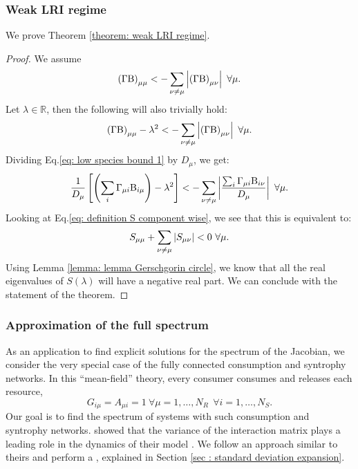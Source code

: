 \documentclass[12pt, titlepage, twoside, openright]{report}
\begin{document}
\subsubsection{Weak LRI regime}\label{sec : weak LRI regime}
We prove Theorem \ref{theorem: weak LRI regime}.
\begin{proof}
We assume
\begin{equation}
\left(\Gamma \text{B}\right)_{\mu\mu} < - \sum_{\nu \neq \mu } \left|{\left(\Gamma \text{B}\right)_{\mu \nu}}\right|  \ \forall \mu.
\end{equation}
Let $\lambda \in \mathbb{R}$, then the following will also trivially hold:
\begin{equation}
  \left(\Gamma\Beta \right)_{\mu\mu} -\lambda^2 < - \sum_{\nu \neq \mu } \abs{\left(\Gamma \Beta\right)_{\mu \nu}} \ \forall \mu. \label{eq: low species bound 1}
\end{equation}
Dividing Eq.\eqref{eq: low species bound 1} by $D_\mu$, we get:
\begin{equation}
\frac{1}{D_\mu}\left[\left(\sum_i \Gamma_{\mu i} \Beta_{i \mu} \right)-{\lambda^2}\right] < - \sum_{\nu \neq \mu } \abs{\frac{\sum_i \Gamma_{\mu i}\Beta_{i\nu}}{D_\mu}} \ \forall \mu.
\end{equation}
Looking at Eq.\eqref{eq: definition S component wise}, we see that this is equivalent to:
\begin{equation}
S_{\mu \mu} + \sum_{\nu \neq \mu} \left|{S_{\mu \nu}}\right| < 0\ \forall \mu.
\end{equation}
Using Lemma \ref{lemma: lemma Gerschgorin circle}, we know that all the real eigenvalues of $S(\lambda)$ will have a negative real part.
We can conclude with the statement of the theorem.
\end{proof}

\normalfont

\subsubsection{Approximation of the full spectrum }\label{sec: approximate full spectrum}
As an application to find explicit solutions for the spectrum of the Jacobian, we consider the very special case of the fully connected consumption and syntrophy networks. In this ``mean-field'' theory, every consumer consumes and releases each resource, \ie
\begin{equation}
G_{i\mu}=A_{\mu i}=1 \ \forall \mu=1, \dots, N_R \ \ \forall i=1, \dots, N_S.
\end{equation}
Our goal is to find the spectrum of systems with such consumption and syntrophy networks.
\citeauthor{barbier_cavity_2017} showed that the variance of the interaction matrix plays a leading role in the dynamics of their model \cite{barbier_cavity_2017}. We follow an approach similar to theirs and perform a , explained in Section \ref{sec : standard deviation expansion}.
\end{document}
